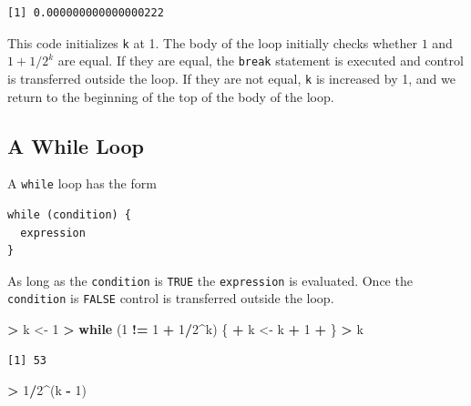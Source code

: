 \documentclass[]{krantz}
\makeatletter
\newenvironment{Shaded}{\begin{snugshade}}{\end{snugshade}}
\newcommand{\ControlFlowTok}[1]{\textcolor[rgb]{0.27,0.27,0.27}{\textbf{#1}}}
\newcommand{\DecValTok}[1]{\textcolor[rgb]{0.06,0.06,0.06}{#1}}
\newcommand{\NormalTok}[1]{#1}
\newcommand{\OperatorTok}[1]{\textcolor[rgb]{0.43,0.43,0.43}{\textbf{#1}}}
\newcommand{\StringTok}[1]{\textcolor[rgb]{0.5,0.5,0.5}{#1}}
\newenvironment{kframe}{%
\medskip{}
\setlength{\fboxsep}{.8em}
 \def\at@end@of@kframe{}%
 \ifinner\ifhmode%
  \def\at@end@of@kframe{\end{minipage}}%
  \begin{minipage}{\columnwidth}%
 \fi\fi%
 \def\FrameCommand##1{\hskip\@totalleftmargin \hskip-\fboxsep
 \colorbox{shadecolor}{##1}\hskip-\fboxsep
     \hskip-\linewidth \hskip-\@totalleftmargin \hskip\columnwidth}%
 \MakeFramed {\advance\hsize-\width
   \@totalleftmargin\z@ \linewidth\hsize
   \@setminipage}}%
 {\par\unskip\endMakeFramed%
 \at@end@of@kframe}
\renewenvironment{Shaded}{\begin{kframe}}{\end{kframe}}
\makeatother
\begin{document}
\begin{verbatim}
[1] 0.000000000000000222
\end{verbatim}

This code initializes \texttt{k} at 1. The body of the loop initially checks whether \(1\) and \(1+1/2^k\) are equal. If they are equal, the \texttt{break} statement is executed and control is transferred outside the loop. If they are not equal, \texttt{k} is increased by 1, and we return to the beginning of the top of the body of the loop.

\hypertarget{a-while-loop}{%
\subsection{A While Loop}\label{a-while-loop}}

A \texttt{while} loop has the form

\begin{verbatim}
while (condition) {
  expression
}
\end{verbatim}

As long as the \texttt{condition} is \texttt{TRUE} the \texttt{expression} is evaluated. Once the \texttt{condition} is \texttt{FALSE} control is transferred outside the loop.

\begin{Shaded}
\begin{Highlighting}[]
\OperatorTok{>}\StringTok{ }\NormalTok{k <-}\StringTok{ }\DecValTok{1}
\OperatorTok{>}\StringTok{ }\ControlFlowTok{while}\NormalTok{ (}\DecValTok{1} \OperatorTok{!=}\StringTok{ }\DecValTok{1} \OperatorTok{+}\StringTok{ }\DecValTok{1}\OperatorTok{/}\DecValTok{2}\OperatorTok{^}\NormalTok{k) \{}
\OperatorTok{+}\StringTok{   }\NormalTok{k <-}\StringTok{ }\NormalTok{k }\OperatorTok{+}\StringTok{ }\DecValTok{1}
\OperatorTok{+}\StringTok{ }\NormalTok{\}}
\OperatorTok{>}\StringTok{ }\NormalTok{k}
\end{Highlighting}
\end{Shaded}

\begin{verbatim}
[1] 53
\end{verbatim}

\begin{Shaded}
\begin{Highlighting}[]
\OperatorTok{>}\StringTok{ }\DecValTok{1}\OperatorTok{/}\DecValTok{2}\OperatorTok{^}\NormalTok{(k }\OperatorTok{-}\StringTok{ }\DecValTok{1}\NormalTok{)}
\end{Highlighting}
\end{Shaded}
\end{document}
